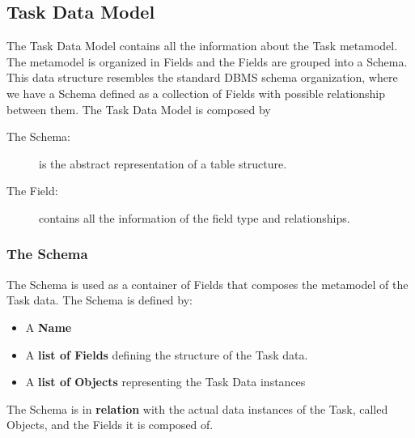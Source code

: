 \subsection{Task Data Model}\label{data:model}
The Task Data Model contains all the information about the Task metamodel. The
metamodel is organized in Fields and the Fields are grouped into a Schema. This
data structure resembles the standard DBMS schema organization, where we have
a Schema defined as a collection of Fields with possible relationship between
them. The Task Data Model is composed by
\begin{description}
    \item[The Schema:] is the abstract representation of a table structure.
    \item[The Field:] contains all the information of the field type and
    relationships.
\end{description}


\subsubsection{The Schema}
The Schema is used as a container of Fields that composes the metamodel of the
Task data. The Schema is defined by:
\begin{itemize}
    \item A \textbf{Name}

    \item A \textbf{list of Fields} defining the structure of the Task data.

    \item A \textbf{list of Objects} representing the Task Data instances
\end{itemize}

The Schema is in \textbf{relation} with the actual data instances of the Task,
called Objects, and the Fields it is composed of.



